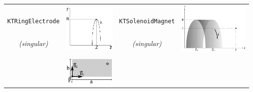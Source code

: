 \documentclass[11pt,a4paper,oneside]{article}
\begin{document}
\begin{table}
\begin{tabular}{|c|c||c|c|}
& \multirow{3}{*}{\includegraphics[scale=.18]{ring.ps}} & &
\multirow{3}{*}{\includegraphics[scale=.18]{solenoid.ps}} \\
\texttt{KTRingElectrode} & & \texttt{KTSolenoidMagnet} & \\
\it{(singular)}& & \it{(singular)} & \\
& & & \\
\hline
& \multirow{3}{*}{\includegraphics[scale=.18]{rectangle.ps}} & &

\end{tabular}
\end{table}
\end{document}
